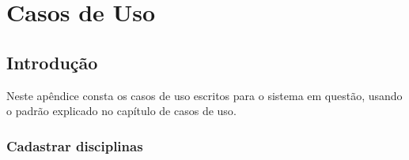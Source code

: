 \chapter{Casos de Uso}\label{chap:use-case-appendix}

\section{Introdução}

Neste apêndice consta os casos de uso escritos para o sistema em questão, usando o padrão explicado no capítulo de casos de uso\cite{funpar2001}.

\subsection{Cadastrar disciplinas}


